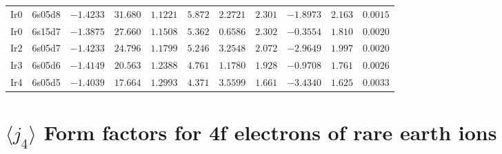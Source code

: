 \begin{table}[H]
{\begin{tabular}{llrrrrrrrrr}
Ir0 & 6s05d8 &$-1.4233$ &$31.680$ &$1.1221$ &$5.872$ &$2.2721$ &$2.301$ &$-1.8973$ &$2.163$ &$0.0015$ \\
Ir0 & 6s15d7 &$-1.3875$ &$27.660$ &$1.1508$ &$5.362$ &$0.6586$ &$2.302$ &$-0.3554$ &$1.810$ &$0.0020$ \\
Ir2 & 6s05d7 &$-1.4233$ &$24.796$ &$1.1799$ &$5.246$ &$3.2548$ &$2.072$ &$-2.9649$ &$1.997$ &$0.0020$ \\
Ir3 & 6s05d6 &$-1.4149$ &$20.563$ &$1.2388$ &$4.761$ &$1.1780$ &$1.928$ &$-0.9708$ &$1.761$ &$0.0026$ \\
Ir4 & 6s05d5 &$-1.4039$ &$17.664$ &$1.2993$ &$4.371$ &$3.5599$ &$1.661$ &$-3.4340$ &$1.625$ &$0.0033$ \\
\hline
\end{tabular}
}
\end{table}
\section{{\large$\langle j_4\rangle$} Form factors for 4f electrons of rare earth ions}
